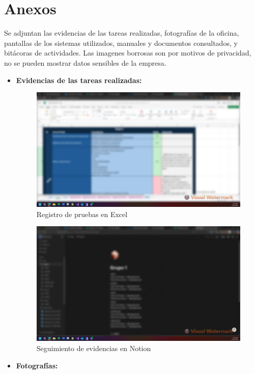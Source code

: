 \documentclass[12pt,a4paper]{report}
\begin{document}
\chapter{Anexos}
Se adjuntan las evidencias de las tareas realizadas, fotografías de la oficina, pantallas de los sistemas utilizados, manuales y documentos consultados, y bitácoras de actividades. Las imagenes borrosas son por motivos de privacidad, no se pueden mostrar datos sensibles de la empresa.
\begin{itemize}
    \item \textbf{Evidencias de las tareas realizadas:}
    \begin{figure}[H]
      \centering
      \includegraphics[width=14cm]{images/evidenciatareasrealizadas/excel.png}
      \caption{Registro de pruebas en Excel}
    \end{figure}
    \begin{figure}[H]
      \centering
      \includegraphics[width=14cm]{images/evidenciatareasrealizadas/notion.png}
      \caption{Seguimiento de evidencias en Notion}
    \end{figure}
    \item \textbf{Fotografías:}

\end{itemize}
\end{document}
